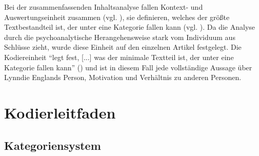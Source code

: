 \documentclass[12pt, titlepage=true, toc=bib]{scrartcl}
\begin{document}
Bei der zusammenfassenden Inhaltsanalyse fallen Kontext- und Auswertungseinheit zusammen (vgl. \cite[71]{mayring_qualitative_2010}), sie definieren, welches der größte Textbestandteil ist, der unter eine Kategorie fallen kann (vgl. \cite[59]{mayring_qualitative_2010}). Da die Analyse durch die psychoanalytische Herangehensweise stark vom Individuum aus Schlüsse zieht, wurde diese Einheit auf den einzelnen Artikel festgelegt. Die Kodiereinheit "`legt fest, [...] was der minimale Textteil ist, der unter eine Kategorie fallen kann"' (\cite[59]{mayring_qualitative_2010}) und ist in diesem Fall jede vollständige Aussage über Lynndie Englands Person, Motivation und Verhältnis zu anderen Personen.



\newpage

\printbibheading[title=Literaturverzeichnis]
\printbibliography[heading=subbibliography, keyword={Quelle}, title={Quellen}]
\printbibliography[heading=subbibliography, notkeyword={Quelle}]
\newpage

\appendix

\addpart{\appendixname}

\section{Kodierleitfaden}

\subsection*{Kategoriensystem}
\end{document}
